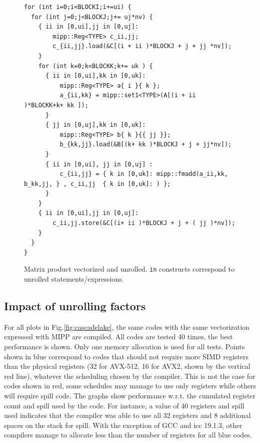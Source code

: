 \documentclass{article}
\begin{document}
\begin{figure}
  \begin{lstlisting}
for (int i=0;i<BLOCKI;i+=ui) {                
  for (int j=0;j<BLOCKJ;j+= uj*nv) {           
    { ii in [0,ui],jj in [0,uj]:
        mipp::Reg<TYPE> c_ii,jj;
        c_{ii,jj}.load(&C[(i + ii )*BLOCKJ + j + jj *nv]);
    }                
    for (int k=0;k<BLOCKK;k+= uk ) {            
      { ii in [0,ui],kk in [0,uk]:
          mipp::Reg<TYPE> a{ i }{ k };
          a_{ii,kk} = mipp::set1<TYPE>(A[(i + ii )*BLOCKK+k+ kk ]);
      }
      { jj in [0,uj],kk in [0,uk]:
          mipp::Reg<TYPE> b{ k }{{ jj }};
          b_{kk,jj}.load(&B[(k+ kk )*BLOCKJ + j + jj*nv]);
      }    
      { ii in [0,ui], jj in [0,uj] :
          c_{ii,jj} = { k in [0,uk]: mipp::fmadd(a_ii,kk, b_kk,jj, } , c_ii,jj  { k in [0,uk]: ) };
      }
    }
    { ii in [0,ui],jj in [0,uj]:
        c_ii,jj.store(&C[(i+ ii )*BLOCKJ + j + ( jj )*nv]);      
    }
  }
}
  \end{lstlisting}
  \caption{Matrix product vectorized and unrolled\label{fig:gemm}. \texttt{in} constructs correspond to unrolled statements/expressions. }
\end{figure}


\subsection{Impact of unrolling factors}
For all plots in Fig.\ref{fig:cascadelake}, the same codes with the same vectorization expressed with MIPP are
compiled. All codes are tested 40 times, the best performance is shown. Only one memory allocation is used for all tests. Points shown in blue correspond to codes that should not require
more SIMD registers than the physical registers (32 for AVX-512, 16 for AVX2, shown by the vertical red line), whatever
the scheduling chosen by the compiler. This is not the case for codes
shown in red, some schedules may manage to use only registers while
others will require spill code. The graphs show performance w.r.t. the
cumulated register count and spill used by the code. For instance, a value of 40 registers and
spill used indicates that the compiler was able to use all 32
registers and 8 additional spaces on the stack for spill. With the exception of
GCC and icc 19.1.3, other compilers manage to allocate less than the number of registers for all
blue codes.
\end{document}
